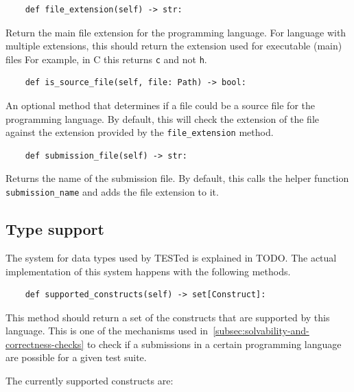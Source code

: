 \documentclass[../main]{subfiles}
\begin{document}
\begin{verbatim}
    def file_extension(self) -> str:
\end{verbatim}

Return the main file extension for the programming language.
For language with multiple extensions, this should return the extension used for executable (main) files
For example, in C this returns \texttt{c} and not \texttt{h}.

\begin{verbatim}
    def is_source_file(self, file: Path) -> bool:
\end{verbatim}

An optional method that determines if a file could be a source file for the programming language.
By default, this will check the extension of the file against the extension provided by the \texttt{file_extension} method.

\begin{verbatim}
    def submission_file(self) -> str:
\end{verbatim}

Returns the name of the submission file.
By default, this calls the helper function \texttt{submission_name} and adds the file extension to it.

\subsection{Type support}\label{subsec:type-support}

The system for data types used by TESTed is explained in TODO.
The actual implementation of this system happens with the following methods.

\begin{verbatim}
    def supported_constructs(self) -> set[Construct]:
\end{verbatim}

This method should return a set of the constructs that are supported by this language.
This is one of the mechanisms used in~\cref{subsec:solvability-and-correctness-checks} to check if a submissions in a certain programming language are possible for a given test suite.

The currently supported constructs are:
\end{document}
